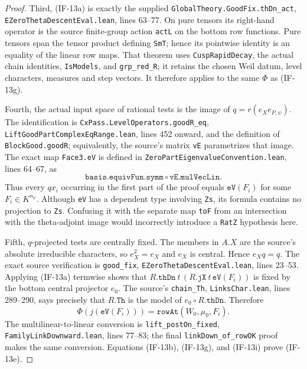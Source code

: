 \begin{proof}
Third, (IF-13a) is exactly the supplied
\texttt{GlobalTheory.GoodFix.thDn\_act},
\texttt{EZeroThetaDescentEval.lean}, lines 63--77. On pure tensors
its right-hand operator is the source finite-group action
\texttt{actL} on the bottom row functions. Pure tensors span the
tensor product defining \texttt{SmT}; hence its pointwise
identity is an equality of the linear row maps. That theorem
uses \texttt{CuspRapidDecay}, the actual chain identities,
\texttt{IsModels}, and \texttt{grp\_red\_R}; it retains the
chosen Weil datum, level characters, measures and step vectors.
It therefore applies to the same $\Phi$ as (IF-13g).

Fourth, the actual input space of rational tests is the image of
$q=r(e_Xe_{P,\psi})$. The identification is
\texttt{CxPass.LevelOperators.goodR\_eq},
\texttt{LiftGoodPartComplexEqRange.lean}, lines 452 onward,
and the definition of
\texttt{BlockGood.goodR}; equivalently, the source's matrix
\texttt{vE} parametrizes that image. The exact map
\texttt{Face3.eV} is defined in
\texttt{ZeroPartEigenvalueConvention.lean}, lines 64--67, as
\[
 \texttt{basis.equivFun.symm}\circ
                 \texttt{vE.mulVecLin}.                   \tag{IF-13h}
\]
Thus every $qx_i$ occurring in the first part of the proof equals
$\texttt{eV}(F_i)$ for some $F_i\in K^{n_V}$. Although
\texttt{eV} has a dependent type involving \texttt{Zs}, its
formula contains no projection to \texttt{Zs}. Confusing it with
the separate map \texttt{toF} from an intersection with the
theta-adjoint image would incorrectly introduce a
\texttt{RatZ} hypothesis here.

Fifth, $q$-projected tests are centrally fixed. The members
in $A.X$ are the source's absolute irreducible characters, so
$e_X^2=e_X$ and $e_X$ is central. Hence $e_Xq=q$.
The exact source verification is \texttt{good\_fix},
\texttt{EZeroThetaDescentEval.lean}, lines 23--53. Applying
(IF-13a) termwise shows that
$R.\texttt{thDn}\ t\,(R.\texttt{jX}\ t\,\texttt{eV}(F_i))$
is fixed by the bottom central projector $e_0$.
The source's \texttt{chain\_Th},
\texttt{LinksChar.lean}, lines 289--290, says precisely that
$R.\texttt{Th}$ is the model of $e_0\circ R.\texttt{thDn}$.
Therefore
\[
 \Phi(j(\texttt{eV}(F_i)))
        =\texttt{rowAt}(W_0,\mu_0,F_i).                    \tag{IF-13i}
\]
The multilinear-to-linear conversion is
\texttt{lift\_postOn\_fixed},
\texttt{FamilyLinkDownward.lean}, lines 77--83; the final
\texttt{linkDown\_of\_rowOK} proof makes the same conversion.
Equations (IF-13b), (IF-13g), and (IF-13i) prove (IF-13e).


\end{proof}
